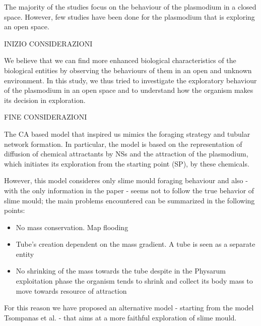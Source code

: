 The majority of the studies focus on the behaviour of the plasmodium in a closed space. However, few studies have been done for the plasmodium that is exploring an open space. 
\par
INIZIO CONSIDERAZIONI
\par
We believe that we can find more enhanced biological characteristics of the biological entities by observing the behaviours of them in an open and unknown environment. In this study, we thus tried to investigate the exploratory behaviour of the plasmodium in an open space and to understand how the organism makes its decision in exploration. 
\par
FINE CONSIDERAZIONI
\par
The CA based model that inspired us \cite{Tsompanas2016} mimics the foraging strategy and tubular network formation. In particular, the model is based on the representation of diffusion of chemical attractants by NSs and the attraction of the plasmodium, which initiates its exploration from the starting point (SP), by these chemicals. 
\par
However, this model consideres only slime mould foraging behaviour and also - with the only information in the paper - seems not to follow the true behavior of slime mould; the main problems encountered can be summarized in the following points:
\begin{itemize}
	\item No mass conservation. Map flooding
	\item Tube's creation dependent on the mass gradient. A tube is seen as a separate entity
	\item No shrinking of the mass towards the tube despite in the Physarum exploitation phase the organism tends to shrink and collect its body mass to move towards resource of attraction

\end{itemize}

For this reason we have proposed an alternative model - starting from the model Tsompanas et al. \cite{Tsompanas2016} - that aims at a more faithful exploration of slime mould.

